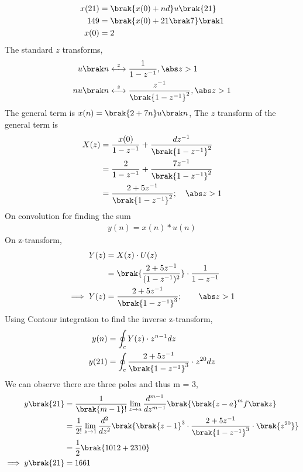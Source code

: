 \documentclass[journal,12pt,twocolumn]{IEEEtran}
\theoremstyle{remark}
\begin{document}
\begin{enumerate}
\begin{align}
x(21) &= \brak{x(0)+nd}u\brak {21}\\
149 &= \brak{x(0)+21\brak 7}\brak 1\\
x(0) &= 2    
\end{align}
The standard $z$ transforms,
\begin{align}
    u \brak n &\stackrel{z}{\longleftrightarrow} \frac{1}{1-z^{-1}}, \abs z >1\\
   n u\brak n &\stackrel{z}{\longleftrightarrow} \frac{z^{-1}}{\brak{1-z^{-1}}^2}, \abs z >1
\end{align}
The general term is $x(n)=\brak {2+7n}u\brak n$,
The $z$ transform of the general term is 
\begin{align}
X(z)&= \frac{x(0)}{1-z^{-1}}+\frac{dz^{-1}}{\brak{1-z^{-1}}^2} \\
&=\frac{2}{1-z^{-1}}+\frac{7z^{-1}}{{\brak{1-z^{-1}}^2}}\\
&=\frac{2+5z^{-1}}{\brak{1-z^{-1}}^2} ; \quad \abs z>1
\end{align}
On convolution for finding the sum
\begin{align}
    y(n)=x(n)\ast u(n)
\end{align}
On z-transform, 
\begin{align}
Y(z)&=X(z)\cdot U(z)\\
    &=\brak{\frac{{2+5z^{-1}}}{{(1-z^{-1})^2}}} \cdot \frac{1}{{1-z^{-1}}}\\
  \implies Y(z)  &= \frac{2+5z^{-1}}{\brak{1-z^{-1}}^3} ; \quad \quad \abs z>1
\end{align}
Using Contour integration to find the inverse z-transform,
\begin{align}
    y(n)&=\oint_c Y(z)\cdot z^{n-1}dz\\
    y(21)&=\oint_c \frac{2+5z^{-1}}{\brak{1-z^{-1}}^3}\cdot z^{20}dz
\end{align}
We can observe there are three poles and thus m = 3,
\begin{align}
    y\brak{21}&=\frac{1}{\brak{m-1}!} \lim_{z \to a} \frac{d^{m-1}}{dz^{m-1}}\brak{\brak{z-a}^mf\brak z}\\
    &=\frac{1}{2!}\lim_{z \to 1} \frac{d^2}{dz^2} \brak{\brak{z-1}^3\cdot \frac{2+5z^{-1}}{\brak{1-z^{-1}}^3}\cdot \brak{z^{20}}}\\
    &=\frac{1}{2}\brak{1012+2310}\\
    \implies y \brak{21}&=1661
\end{align}
\begin{figure}[h]
    \centering  


\end{figure}
\end{enumerate}
\end{document}
